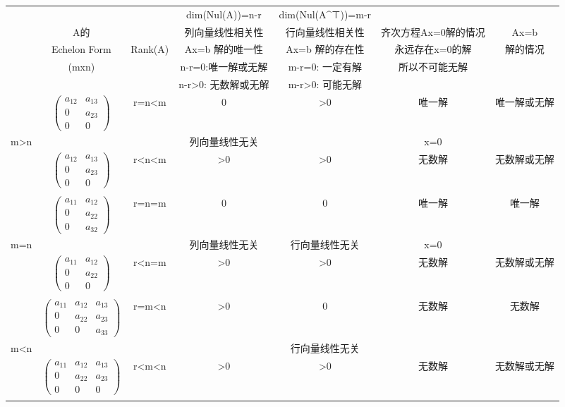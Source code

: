 \begin{tabular}{|c|c|c|c|c|c|c|}
\hline
 &  &  & dim(Nul(A))=n-r & dim(Nul(A^⊤))=m-r &  & \\
 & A的 &  & 列向量线性相关性 & 行向量线性相关性 & 齐次方程Ax=0解的情况 & Ax=b \\
 & Echelon Form & Rank(A) & Ax=b 解的唯一性 & Ax=b 解的存在性 & 永远存在x=0的解 & 解的情况 \\
 & (mxn) &  & n-r=0:唯一解或无解 & m-r=0: 一定有解 & 所以不可能无解 &  \\
 &  &  & n-r>0: 无数解或无解 & m-r>0: 可能无解 &  &  \\ \hline
 & $\begin{pmatrix} a_{12} & a_{13} \\ 0 & a_{23} \\ 0 & 0 \end{pmatrix}$ & r=n<m & 0 & >0 & 唯一解 & 唯一解或无解 \\
m>n &  &  & 列向量线性无关 &  & x=0 &  \\ \cline{2-7} 
 & $\begin{pmatrix} a_{12} & a_{13} \\ 0 & a_{23} \\ 0 & 0 \end{pmatrix}$ & r<n<m & >0 & >0 & 无数解 & 无数解或无解 \\
 &  &  &  &  &  &  \\ \hline
 & $\begin{pmatrix} a_{11} & a_{12} \\ 0 & a_{22} \\ 0 & a_{32} \end{pmatrix}$ & r=n=m & 0 & 0 & 唯一解 & 唯一解 \\
m=n &  &  & 列向量线性无关 & 行向量线性无关 & x=0 &  \\ \cline{2-7} 
 & $\begin{pmatrix} a_{11} & a_{12} \\ 0 & a_{22} \\ 0 & 0 \end{pmatrix}$ & r<n=m & >0 & >0 & 无数解 & 无数解或无解 \\
 &  &  &  &  &  &  \\ \hline
 & $\begin{pmatrix} a_{11} & a_{12} & a_{13} \\ 0 & a_{22} & a_{23} \\ 0 & 0 & a_{33} \end{pmatrix}$ & r=m<n & >0 & 0 & 无数解 & 无数解 \\
m<n &  &  &  & 行向量线性无关 &  &  \\ \cline{2-7} 
 & $\begin{pmatrix} a_{11} & a_{12} & a_{13} \\ 0 & a_{22} & a_{23} \\ 0 & 0 & 0 \end{pmatrix}$ & r<m<n & >0 & >0 & 无数解 & 无数解或无解 \\
 &  &  &  &  &  &  \\ \hline
\end{tabular}